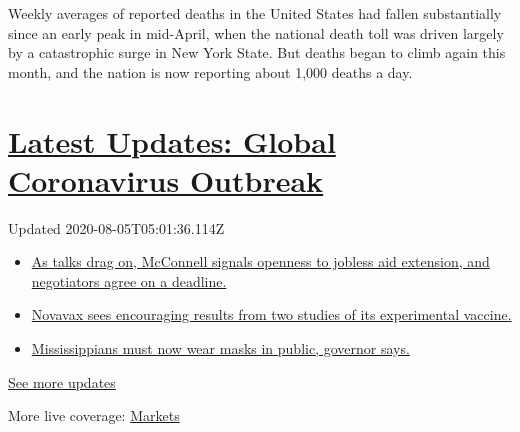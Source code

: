 Weekly averages of reported deaths in the United States had fallen
substantially since an early peak in mid-April, when the national death
toll was driven largely by a catastrophic surge in New York State. But
deaths began to climb again this month, and the nation is now reporting
about 1,000 deaths a day.

\hypertarget{latest-updates-global-coronavirus-outbreak}{%
\section{\texorpdfstring{\href{https://www.nytimes.com/2020/08/04/world/coronavirus-cases.html?action=click\&pgtype=Article\&state=default\&region=MAIN_CONTENT_1\&context=storylines_live_updates}{Latest
Updates: Global Coronavirus
Outbreak}}{Latest Updates: Global Coronavirus Outbreak}}\label{latest-updates-global-coronavirus-outbreak}}

Updated 2020-08-05T05:01:36.114Z

\begin{itemize}
\tightlist
\item
  \href{https://www.nytimes.com/2020/08/04/world/coronavirus-cases.html?action=click\&pgtype=Article\&state=default\&region=MAIN_CONTENT_1\&context=storylines_live_updates\#link-762df92}{As
  talks drag on, McConnell signals openness to jobless aid extension,
  and negotiators agree on a deadline.}
\item
  \href{https://www.nytimes.com/2020/08/04/world/coronavirus-cases.html?action=click\&pgtype=Article\&state=default\&region=MAIN_CONTENT_1\&context=storylines_live_updates\#link-1228a480}{Novavax
  sees encouraging results from two studies of its experimental
  vaccine.}
\item
  \href{https://www.nytimes.com/2020/08/04/world/coronavirus-cases.html?action=click\&pgtype=Article\&state=default\&region=MAIN_CONTENT_1\&context=storylines_live_updates\#link-794484ed}{Mississippians
  must now wear masks in public, governor says.}
\end{itemize}

\href{https://www.nytimes.com/2020/08/04/world/coronavirus-cases.html?action=click\&pgtype=Article\&state=default\&region=MAIN_CONTENT_1\&context=storylines_live_updates}{See
more updates}

More live coverage:
\href{https://www.nytimes.com/live/2020/08/04/business/stock-market-today-coronavirus?action=click\&pgtype=Article\&state=default\&region=MAIN_CONTENT_1\&context=storylines_live_updates}{Markets}

